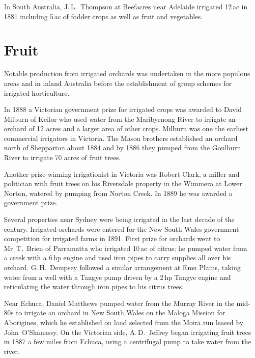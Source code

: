 In South Australia, J.\,L.~Thompson at Beefacres near Adelaide
irrigated 12\,ac in 1881 including 5\,ac of fodder crops as well as
fruit and vegetables.

\section*{Fruit}

Notable production from irrigated orchards was undertaken in the more
populous areas and in inland Australia before the establishment of
group schemes for irrigated horticulture.

In 1888 a Victorian government prize for irrigated crops was awarded
to David Milburn of Keilor who used water from the Maribyrnong River
to irrigate an orchard of 12 acres and a larger area of other crops.
Milburn was one the earliest commercial irrigators in Victoria.  The
Mason brothers established an orchard north of Shepparton about 1884
and by 1886 they pumped from the Goulburn River to irrigate 70 acres
of fruit trees.

Another prize-winning irrigationist in Victoria was Robert Clark, a
miller and politician with fruit trees on his Riversdale property in
the Wimmera at Lower Norton, watered by pumping from Norton Creek.  In
1889 he was awarded a government prize.

Several properties near Sydney were being irrigated in the last decade
of the century.  Irrigated orchards were entered for the New South
Wales government competition for irrigated farms in 1891.  First prize
for orchards went to Mr~T.~Brien of Parramatta who irrigated 10\,ac of
citrus; he pumped water from a creek with a 6\,hp engine and used
iron pipes to carry supplies all over his orchard.  G.\,H.~Dempsey
followed a similar arrangement at Emu Plains, taking water from a well
with a Tangye pump driven by a 2\,hp Tangye engine and reticulating
the water through iron pipes to his citrus trees.

Near Echuca, Daniel Matthews pumped water from the Murray River in the
mid-80s to irrigate an orchard in New South Wales on the Maloga
Mission for Aborigines, which he established on land selected from the
Moira run leased by John~O'Shanassy. On the Victorian side,
A.\,D.~Jeffrey began irrigating fruit trees in 1887 a few miles from
Echuca, using a centrifugal pump to take water from the
river.

